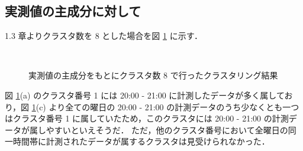 \documentclass[a4j]{jarticle}
\begin{document}
\subsection{実測値の主成分に対して}
1.3 章よりクラスタ数を 8 とした場合を図 \ref{norm} に示す．
\begin{figure}[tb]
\begin{center}
~
\\
\caption{実測値の主成分をもとにクラスタ数 8 で行ったクラスタリング結果}
\label{norm}
\end{center}
\end{figure}

図 \ref{norm}(a) のクラスタ番号 1 には 20:00 - 21:00 に計測したデータが多く属しており，図 \ref{norm}(c) より全ての曜日の 20:00 - 21:00 の計測データのうち少なくとも一つはクラスタ番号 1 に属していたため，このクラスタには 20:00 - 21:00 の計測データが属しやすいといえそうだ．
ただ，他のクラスタ番号において全曜日の同一時間帯に計測されたデータが属するクラスタは見受けられなかった．
\end{document}
